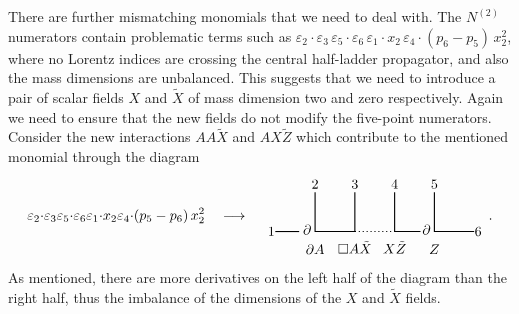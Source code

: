 \documentclass[11pt,a4paper]{article}
\newcommand{\ee}[2]{\varepsilon_{#1} {\cdot} \varepsilon_{#2}}
\newcommand{\z}{x}
\newcommand{\ez}[2]{\varepsilon_{#1} {\cdot} \z_{#2}}
\begin{document}
There are further mismatching monomials that we need to deal with.  The $N^{(2)}$ numerators contain problematic terms such as $\ee{2}{3} \, \ee{5}{6} \, \ez{1}{2} \, \varepsilon_4{\cdot}(p_6-p_5) \, \z_2^2$, where no Lorentz indices are crossing the central half-ladder propagator, and also the mass dimensions are unbalanced. This suggests that we need to introduce a pair of scalar fields $X$ and $\tilde{X}$ of mass dimension two and zero respectively. Again we need to ensure that the new fields do not modify the five-point numerators.  Consider the new interactions $AA \tilde{X}$ and $A X \tilde{Z}$ which contribute to the mentioned monomial through the diagram
\begin{equation}
\ee{2}{3} \ee{5}{6} \ez{1}{2}  \varepsilon_4 {\cdot} (p_5 - p_6) \, \z_2^2
 \ \ \ \longrightarrow \ \ \ 
\begin{tikzpicture}[baseline={(0, +0.3cm)}]
\draw[thick] (-2.5,0) -- (-1.9,0) ;
\draw[thick] (1.5,1) -- (1.5,0) -- (2.5,0);
\draw[thick] (0.5,1) -- (0.5,0) -- (1.15,0);
\draw[thick,dotted] (-0.5,0) -- (0.5,0);
\draw[thick] (-0.5,1) -- (-0.5,0)--(-1.5,0)--(-1.5,1);
\node at (-2.6,0) {$1$};
\node at (-1.5,1.2) {$2$};
\node at (-.5,1.2) {$3$};
\node at (.5,1.2) {$4$};
\node at (1.5,1.2) {$5$};
\node at (2.6,0) {$6$};
\node at (-1.5,-0.45) {$ \partial A $};
\node at (-0.5,-0.4) {$ \Box A \tilde{X} $};
\node at (0.5,-0.4) {$X \tilde{Z}$};
\node at (1.5,-0.45) {$Z$};
\node at (1.3,0.05) {$\partial$};
\node at (-1.7,0.05) {$\partial$};
\end{tikzpicture}
\, .
\end{equation}
As mentioned, there are more derivatives on the left half of the diagram than the right half, thus the imbalance of the dimensions of the $X$ and $\tilde{X}$ fields.  
\end{document}
